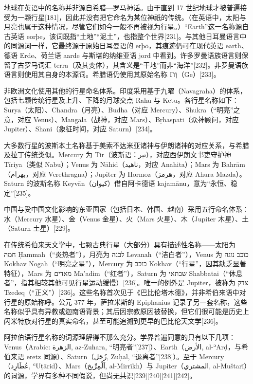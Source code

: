 地球在英语中的名称并非源自希腊—罗马神话。由于直到 17 世纪地球才被普遍接受为一颗行星[181]，因此并没有把它命名为某位神祇的传统。（在英语中，太阳与月亮也属于这种情况，尽管它们如今一般不再被视为行星。）“Earth”这一名称源自古英语 eorþe，该词既指“土地”“泥土”，也指整个世界[231]。与其他日耳曼语言中的同源词一样，它最终源于原始日耳曼语的 erþō，其痕迹仍可在现代英语 earth、德语 Erde、荷兰语 aarde 与斯堪的纳维亚语 jord 中看到。许多罗曼语族语言则保留了古罗马词汇 terra（及其变体），其含义是“干地”而非“海洋”[232]。非罗曼语族语言则使用其自身的本源词。希腊语仍使用其原始名称 Γή（Ge）[233]。

非欧洲文化使用其他的行星命名体系。印度采用基于九曜（Navagraha）的体系，包括七颗传统行星及上升、下降的月球交点 Rahu 与 Ketu。各行星名称如下：Surya（太阳）、Chandra（月亮）、Budha（对应 Mercury）、Shukra（“明亮”之意，对应 Venus）、Mangala（战神，对应 Mars）、Bṛhaspati（众神顾问，对应 Jupiter）、Shani（象征时间，对应 Saturn）[234]。

大多数行星的波斯本土名称基于美索不达米亚诸神与伊朗诸神的对应关系，与希腊及拉丁传统类似。Mercury 为 Tir（波斯语：تیر），对应西伊朗文书吏守护神 Tīriya（类似 Nabu）；Venus 为 Nāhid（ناهید，对应 Anahita）；Mars 为 Bahrām（بهرام，对应 Verethragna）；Jupiter 为 Hormoz（هرمز，对应 Ahura Mazda）。Saturn 的波斯名称 Keyvān（کیوان）借自阿卡德语 kajamānu，意为“永恒、稳定”[235]。

中国与受中国文化影响的东亚国家（包括日本、韩国、越南）采用五行命名体系：水（Mercury 水星）、金（Venus 金星）、火（Mars 火星）、木（Jupiter 木星）、土（Saturn 土星）[229]。

在传统希伯来天文学中，七颗古典行星（大部分）具有描述性名称——太阳为 חמה Ḥammah（“炎热者”），月亮为 לבנה Levanah（“洁白者”），Venus 为 כוכב נוגה Kokhav Nogah（“明亮之星”），Mercury 为 כוכב Kokhav（“行星”，因其缺乏显著特征），Mars 为 מאדים Ma'adim（“红者”），Saturn 为 שבתאי Shabbatai（“休息者”，指其相较其他可见行星运动缓慢）[236]。唯一的例外是 Jupiter，被称为 צדק Tzedeq（“正义”）[236]。这些名称首次见于《巴比伦塔木德》，并非希伯来语中对行星的原始称呼。公元 377 年，萨拉米斯的 Epiphanius 记录了另一套名称，这些名称似乎具有异教或迦南语背景；其后因宗教原因被替换，但它们很可能是历史上闪米特族对行星的真实命名，甚至可能追溯到更早的巴比伦天文学[236]。

阿拉伯语行星名称的词源理解得不那么充分。学界普遍同意的只有以下几项：Venus（Arabic: الزهرة, az-Zuhara, “明亮者”[237]）、Earth（الأرض, al-ʾArḍ，与希伯来语 eretz 同源）、Saturn（زُحَل, Zuḥal, “退离者”[238]）。至于 Mercury（عُطَارِد, ʿUṭārid）、Mars（اَلْمِرِّيخ, al-Mirrīkh）与 Jupiter（المشتري, al-Muštarī）的词源，学界有多种不同假说，但尚无共识[239][240][241][242]。
